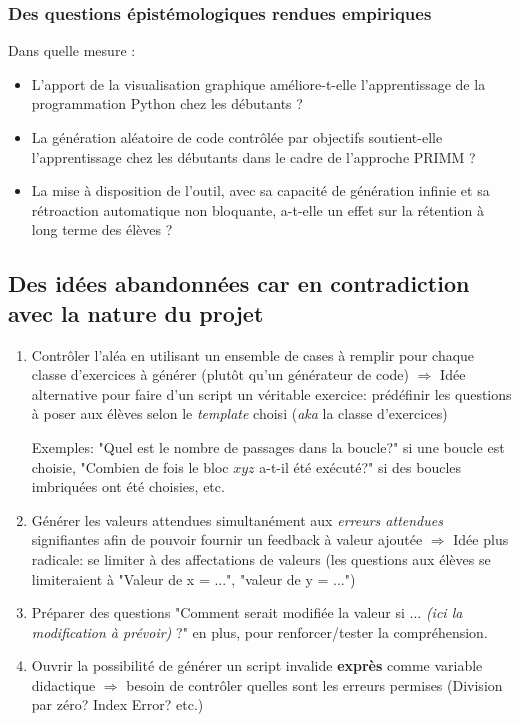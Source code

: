 \documentclass[11pt,a4paper]{article}
\begin{document}
\subsubsection{Des questions épistémologiques rendues empiriques}
Dans quelle mesure :\begin{itemize}
    \item L'apport de la visualisation graphique améliore-t-elle l'apprentissage de la programmation Python chez les débutants ?
    \item La génération aléatoire de code contrôlée par objectifs soutient-elle l'apprentissage chez les débutants dans le cadre de l'approche PRIMM ?
    \item La mise à disposition de l'outil, avec sa capacité de génération infinie et sa rétroaction automatique non bloquante, a-t-elle un effet sur la rétention à long terme des élèves ?

\end{itemize}


\subsection{Des idées abandonnées car en contradiction avec la nature du projet}
\begin{enumerate}
    \item Contrôler l'aléa en utilisant un ensemble de cases à remplir pour chaque classe d'exercices à générer (plutôt qu'un générateur de code) $\Rightarrow$ Idée alternative pour faire d'un script un véritable exercice: prédéfinir les questions à poser aux élèves selon le \textit{template} choisi (\textit{aka} la classe d'exercices)\par Exemples: "Quel est le nombre de passages dans la boucle?" si une boucle est choisie, "Combien de fois le bloc $xyz$ a-t-il été exécuté?" si des boucles imbriquées ont été choisies, etc. 
    
    \item Générer les valeurs attendues simultanément aux \textit{erreurs attendues} signifiantes afin de pouvoir fournir un feedback à valeur ajoutée $\Rightarrow$ Idée plus radicale: se limiter à des affectations de valeurs (les questions aux élèves se limiteraient à "Valeur de x = ...", "valeur de y = ...")

    \item Préparer des questions "Comment serait modifiée la valeur si ... \textit{(ici la modification à prévoir)} ?" en plus, pour renforcer/tester la compréhension.
    
    \item Ouvrir la possibilité de générer un script invalide \textbf{exprès} comme variable didactique $\Rightarrow$ besoin de contrôler quelles sont les erreurs permises (Division par zéro? Index Error? etc.) 
\end{enumerate}
\end{document}
